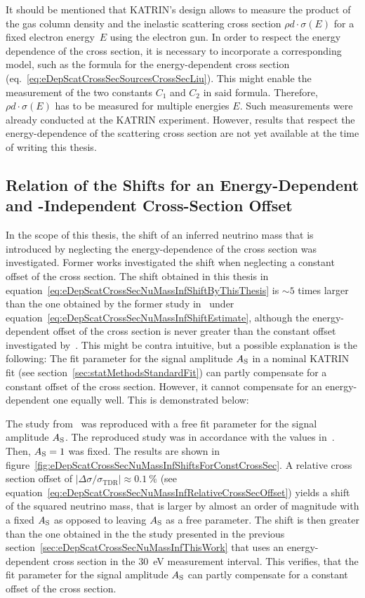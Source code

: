 It should be mentioned that KATRIN's design allows to measure the product of the gas column density and the inelastic scattering cross section $\rho d \cdot \sigma(E)$ for a fixed electron energy~$E$ using the electron gun. In order to respect the energy dependence of the cross section, it is necessary to incorporate a corresponding model, such as the formula for the energy-dependent cross section (eq.~\ref{eq:eDepScatCrossSecSourcesCrossSecLiu}). This might enable the measurement of the two constants $C_1$ and $C_2$ in said formula. Therefore, $\rho d \cdot \sigma(E)$ has to be measured for multiple energies $E$. Such measurements were already conducted at the KATRIN experiment. However, results that respect the energy-dependence of the scattering cross section are not yet available at the time of writing this thesis.

\subsection{Relation of the Shifts for an Energy-Dependent and -Independent Cross-Section Offset}
\label{sec:eDepScatCrossSecNuMassInfRelateGrohAndFormerWork}
In the scope of this thesis, the shift of an inferred neutrino mass that is introduced by neglecting the energy-dependence of the cross section was investigated. Former works investigated the shift when neglecting a constant offset of the cross section. The shift obtained in this thesis in equation~\eqref{eq:eDepScatCrossSecNuMassInfShiftByThisThesis} is $\sim5$ times larger than the one obtained by the former study in~\cite{Groh2015} under equation~\eqref{eq:eDepScatCrossSecNuMassInfShiftEstimate}, although the energy-dependent offset of the cross section is never greater than the constant offset investigated by~\cite{Groh2015}. This might be contra intuitive, but a possible explanation is the following: The fit parameter for the signal amplitude $A_{\mathrm{S}}$ in a nominal KATRIN fit (see section~\ref{sec:statMethodsStandardFit}) can partly compensate for a constant offset of the cross section. However, it cannot compensate for an energy-dependent one equally well. This is demonstrated below:

The study from~\cite{Groh2015} was reproduced with a free fit parameter for the signal amplitude $A_{\mathrm{S}}$. The reproduced study was in accordance with the values in~\cite{Groh2015}. Then, $A_{\mathrm{S}}=1$ was fixed. The results are shown in figure~\ref{fig:eDepScatCrossSecNuMassInfShiftsForConstCrossSec}. A relative cross section offset of $
\left|
	\Delta\sigma/\sigma_\mathrm{TDR}
\right| \approx \SI{0.1}{\percent}
$ (see equation~\ref{eq:eDepScatCrossSecNuMassInfRelativeCrossSecOffset}) yields a shift of the squared neutrino mass, that is larger by almost an order of magnitude with a fixed $A_{\mathrm{S}}$ as opposed to leaving $A_{\mathrm{S}}$ as a free parameter. The shift is then greater than the one obtained in the the study presented in the previous section~\ref{sec:eDepScatCrossSecNuMassInfThisWork} that uses an energy-dependent cross section in the \SI{30}{eV} measurement interval. This verifies, that the fit parameter for the signal amplitude $A_{\mathrm{S}}$ can partly compensate for a constant offset of the cross section. 

